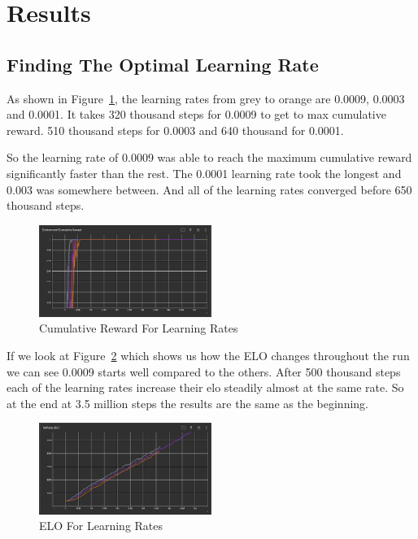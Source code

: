 \documentclass{LSkill}
\begin{document}
\section{Results}
\subsection{Finding The Optimal Learning Rate}
As shown in Figure~\ref{fig:Cumulative Reward For Learning Rates}, the learning rates from grey to orange are 0.0009, 0.0003 and 0.0001. It takes 320 thousand steps for 0.0009 to get to max cumulative reward. 510 thousand steps for 0.0003 and 640 thousand for 0.0001.

So the learning rate of 0.0009 was able to reach the maximum cumulative reward significantly faster than the rest. The 0.0001 learning rate took the longest and 0.003 was somewhere between. And all of the learning rates converged before 650 thousand steps.


\begin{figure}[htbp]
    \centering
    \includegraphics[width=0.5\textwidth]{figure 2.png} 
    \caption{Cumulative Reward For Learning Rates}
    \label{fig:Cumulative Reward For Learning Rates}
\end{figure}

If we look at Figure~\ref{fig:ELO For Learning Rates} which shows us how the ELO changes throughout the run we can see 0.0009 starts well compared to the others. After 500 thousand steps each of the learning rates increase their elo steadily almost at the same rate. So at the end at 3.5 million steps the results are the same as the beginning.

\begin{figure}[htbp]
    \centering
    \includegraphics[width=0.5\textwidth]{figure 3.png} 
    \caption{ELO For Learning Rates}
    \label{fig:ELO For Learning Rates}
\end{figure}
\end{document}
